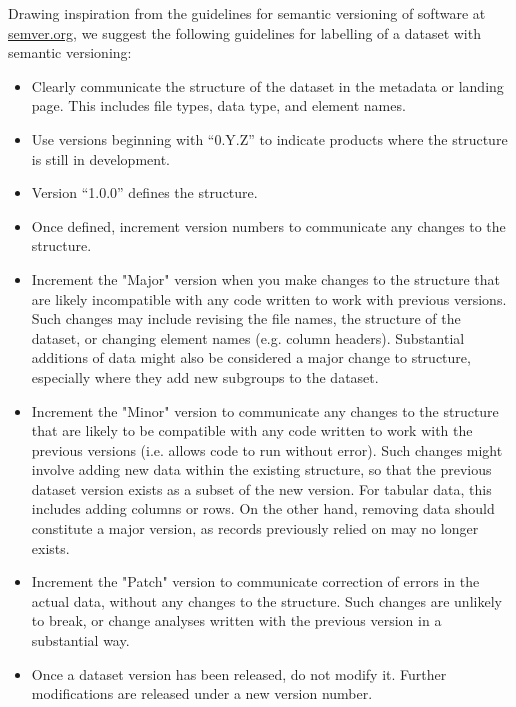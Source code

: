 \documentclass[a4paper,num-refs]{assets/oup-contemporary}
\begin{document}
Drawing inspiration from the guidelines for semantic versioning of software at \href{http://semver.org/}{semver.org}, we suggest the following guidelines for labelling of a dataset with semantic versioning:
\begin{itemize}
  \item Clearly communicate the structure of the dataset in the metadata or landing page. This includes file types, data type, and element names.
  \item Use versions beginning with ``0.Y.Z'' to indicate products where the structure is still in development.
  \item Version ``1.0.0'' defines the structure. 
  \item Once defined, increment version numbers to communicate any changes to the structure.
  \item Increment the "Major" version when you make changes to the structure that are likely incompatible with any code written to work with previous versions. Such changes may include revising the file names, the structure of the dataset, or changing element names (e.g. column headers). Substantial additions of data might also be considered a major change to structure, especially where they add new subgroups to the dataset.
  \item Increment the "Minor" version to communicate any changes to the structure that are likely to be compatible with any code written to work with the previous versions (i.e. allows code to run without error). Such changes might involve adding new data within the existing structure, so that the previous dataset version exists as a subset of the new version. For tabular data, this includes adding columns or rows. On the other hand, removing data should constitute a major version, as records previously relied on may no longer exists.
  \item Increment the "Patch" version to communicate correction of errors in the actual data, without any changes to the structure. Such changes are unlikely to break, or change analyses written with the previous version in a substantial way.
  \item Once a dataset version has been released, do not modify it. Further modifications are released under a new version number.
\end{itemize}
\end{document}
